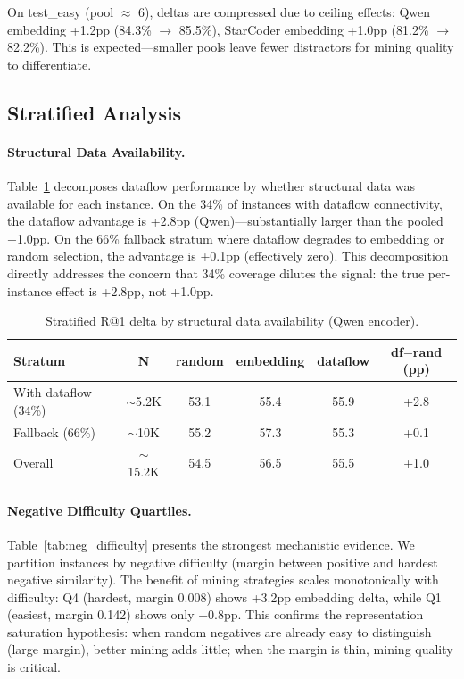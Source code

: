 \documentclass[11pt]{article}
\begin{document}
On test\_easy (pool $\approx$ 6), deltas are compressed due to ceiling effects: Qwen embedding +1.2pp (84.3\% $\to$ 85.5\%), StarCoder embedding +1.0pp (81.2\% $\to$ 82.2\%).
This is expected---smaller pools leave fewer distractors for mining quality to differentiate.

\subsection{Stratified Analysis}
\label{sec:stratified}

\paragraph{Structural Data Availability.}
Table~\ref{tab:stratified_structural} decomposes dataflow performance by whether structural data was available for each instance.
On the 34\% of instances with dataflow connectivity, the dataflow advantage is +2.8pp (Qwen)---substantially larger than the pooled +1.0pp.
On the 66\% fallback stratum where dataflow degrades to embedding or random selection, the advantage is +0.1pp (effectively zero).
This decomposition directly addresses the concern that 34\% coverage dilutes the signal: the true per-instance effect is +2.8pp, not +1.0pp.

\begin{table}[h]
\centering
\caption{Stratified R@1 delta by structural data availability (Qwen encoder).}
\label{tab:stratified_structural}
\begin{tabular}{lccccc}
\toprule
\textbf{Stratum} & \textbf{N} & \textbf{random} & \textbf{embedding} & \textbf{dataflow} & \textbf{df$-$rand (pp)} \\
\midrule
With dataflow (34\%) & $\sim$5.2K & 53.1 & 55.4 & 55.9 & +2.8 \\
Fallback (66\%) & $\sim$10K & 55.2 & 57.3 & 55.3 & +0.1 \\
\midrule
Overall & $\sim$15.2K & 54.5 & 56.5 & 55.5 & +1.0 \\
\bottomrule
\end{tabular}
\end{table}

\paragraph{Negative Difficulty Quartiles.}
Table~\ref{tab:neg_difficulty} presents the strongest mechanistic evidence.
We partition instances by negative difficulty (margin between positive and hardest negative similarity).
The benefit of mining strategies scales monotonically with difficulty: Q4 (hardest, margin 0.008) shows +3.2pp embedding delta, while Q1 (easiest, margin 0.142) shows only +0.8pp.
This confirms the representation saturation hypothesis: when random negatives are already easy to distinguish (large margin), better mining adds little; when the margin is thin, mining quality is critical.
\end{document}

